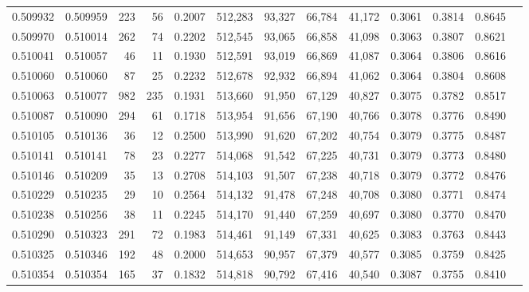 \begin{tabular}{rrrrrrrrrrrrr}
0.509932 & 0.509959 &   223 &    56 &                                     0.2007 & 512,283 &  93,327 &  66,784 &  41,172 & 0.3061 & 0.3814 & 0.8645 \\
0.509970 & 0.510014 &   262 &    74 &                                     0.2202 & 512,545 &  93,065 &  66,858 &  41,098 & 0.3063 & 0.3807 & 0.8621 \\
0.510041 & 0.510057 &    46 &    11 &                                     0.1930 & 512,591 &  93,019 &  66,869 &  41,087 & 0.3064 & 0.3806 & 0.8616 \\
0.510060 & 0.510060 &    87 &    25 &                                     0.2232 & 512,678 &  92,932 &  66,894 &  41,062 & 0.3064 & 0.3804 & 0.8608 \\
0.510063 & 0.510077 &   982 &   235 &                                     0.1931 & 513,660 &  91,950 &  67,129 &  40,827 & 0.3075 & 0.3782 & 0.8517 \\
0.510087 & 0.510090 &   294 &    61 &                                     0.1718 & 513,954 &  91,656 &  67,190 &  40,766 & 0.3078 & 0.3776 & 0.8490 \\
0.510105 & 0.510136 &    36 &    12 &                                     0.2500 & 513,990 &  91,620 &  67,202 &  40,754 & 0.3079 & 0.3775 & 0.8487 \\
0.510141 & 0.510141 &    78 &    23 &                                     0.2277 & 514,068 &  91,542 &  67,225 &  40,731 & 0.3079 & 0.3773 & 0.8480 \\
0.510146 & 0.510209 &    35 &    13 &                                     0.2708 & 514,103 &  91,507 &  67,238 &  40,718 & 0.3079 & 0.3772 & 0.8476 \\
0.510229 & 0.510235 &    29 &    10 &                                     0.2564 & 514,132 &  91,478 &  67,248 &  40,708 & 0.3080 & 0.3771 & 0.8474 \\
0.510238 & 0.510256 &    38 &    11 &                                     0.2245 & 514,170 &  91,440 &  67,259 &  40,697 & 0.3080 & 0.3770 & 0.8470 \\
0.510290 & 0.510323 &   291 &    72 &                                     0.1983 & 514,461 &  91,149 &  67,331 &  40,625 & 0.3083 & 0.3763 & 0.8443 \\
0.510325 & 0.510346 &   192 &    48 &                                     0.2000 & 514,653 &  90,957 &  67,379 &  40,577 & 0.3085 & 0.3759 & 0.8425 \\
0.510354 & 0.510354 &   165 &    37 &                                     0.1832 & 514,818 &  90,792 &  67,416 &  40,540 & 0.3087 & 0.3755 & 0.8410 \\

\end{tabular}
